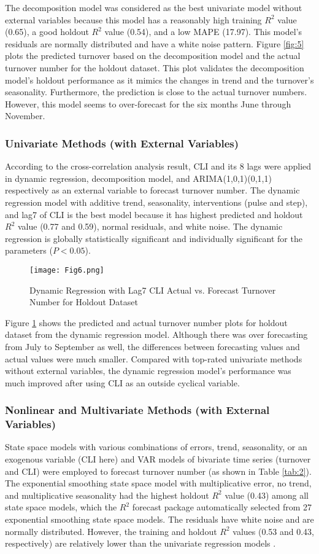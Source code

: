 The decomposition model was considered as the best univariate model without external variables because this model has a reasonably high training $R^2$ value (0.65), a good holdout $R^2$ value (0.54), and a low MAPE (17.97). This model's residuals are normally distributed and have a white noise pattern. Figure \ref{fig:5} plots the predicted turnover based on the decomposition model and the actual turnover number for the holdout dataset. This plot validates the decomposition model's holdout performance as it mimics the changes in trend and the turnover's seasonality. Furthermore, the prediction is close to the actual turnover numbers. However, this model seems to over-forecast for the six months June through November.

\subsubsection{Univariate Methods (with External Variables)}
According to the cross-correlation analysis result, CLI and its 8 lags were applied in dynamic regression, decomposition model, and ARIMA(1,0,1)(0,1,1) respectively as an external variable to forecast turnover number. The dynamic regression model with additive trend, seasonality, interventions (pulse and step), and lag7 of CLI is the best model because it has highest predicted and holdout $R^2$ value (0.77 and 0.59), normal residuals, and white noise. The dynamic regression is globally statistically significant and individually significant for the parameters ($P<0.05$).
\begin{figure}[h!]
	\centering
	\texttt{[image: Fig6.png]}
	\caption{Dynamic Regression with Lag7 CLI  Actual vs. Forecast Turnover Number for Holdout Dataset}
	\label{fig:6}
\end{figure}
Figure \ref{fig:6} shows the predicted and actual turnover number plots for holdout dataset from the dynamic regression model. Although there was over forecasting from July to September as well, the differences between forecasting values and actual values were much smaller. Compared with top-rated univariate methods without external variables, the dynamic regression model's performance was much improved after using CLI as an outside cyclical variable. 

\subsubsection{Nonlinear and Multivariate Methods (with External Variables)}
State space models with various combinations of errors, trend, seasonality, or an exogenous variable (CLI here) and VAR models of bivariate time series (turnover and CLI) were employed to forecast turnover number (as shown in Table \ref{tab:2}). The exponential smoothing state space model with multiplicative error, no trend, and multiplicative seasonality had the highest holdout $R^2$ value (0.43) among all state space models, which the $R^2$ forecast package automatically selected from 27 exponential smoothing state space models. The residuals have white noise and are normally distributed. However, the training and holdout $R^2$ values (0.53 and 0.43, respectively) are relatively lower than the univariate regression models . 
 
